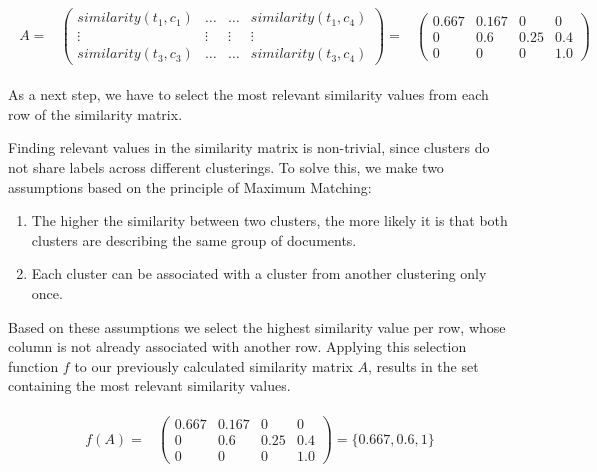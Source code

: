 \begin{gather*}
\begin{array}{rcl}
    A = & \left(\begin{array}{cccc}
        similarity(t_1,c_1) & \hdots & \hdots & similarity(t_1,c_4)\\
        \vdots & \vdots & \vdots & \vdots\\
        similarity(t_3,c_3) & \hdots & \hdots & similarity(t_3,c_4) \end{array}\right)
        = & \left(\begin{array}{cccc}
            0.667 & 0.167 & 0 & 0 \\
            0 & 0.6 & 0.25 & 0.4 \\
            0 &  0 & 0 & 1.0 \end{array}\right)
\end{array}
\end{gather*}

As a next step, we have to select the most relevant similarity values from each row of the similarity matrix.

Finding relevant values in the similarity matrix is non-trivial,
since clusters do not share labels across different clusterings.
To solve this, we make two assumptions based on the principle of Maximum Matching:

\begin{enumerate}
    \item The higher the similarity between two clusters,
          the more likely it is that both clusters are describing the same group of documents.
    \item Each cluster can be associated with a cluster from another clustering only once.
\end{enumerate}

Based on these assumptions we select the highest similarity value per row,
whose column is not already associated with another row.
Applying this selection function $f$ to our previously calculated similarity matrix $A$,
results in the set containing the most relevant similarity values.

\begin{gather*}
    \begin{array}{rcl}
        f(A) = & \left(\begin{array}{cccc}
            \mathbf{0.667} & 0.167 & 0 & 0 \\
            0 & \mathbf{0.6} & 0.25 & 0.4 \\
            0 &  0 & 0 & \mathbf{1.0} \end{array}\right)
            = \{0.667, 0.6, 1\}
    \end{array}
\end{gather*}

